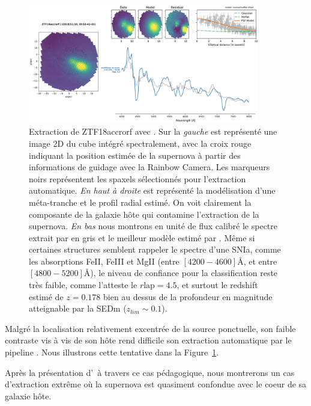 \documentclass[../main/main.tex]{subfiles}
\begin{document}
\begin{figure}[ht]
  \centering
  \includegraphics[width=0.9\textwidth]{../figures/04_hypergal/easycaseextractionpysedm.png}
  \caption[Extraction de ZTF18accrorf avec \pysedm]{Extraction de
    ZTF18accrorf avec \pysedm. Sur la \textit{gauche} est représenté une image 2D
  du cube intégré spectralement, avec la croix rouge indiquant la
  position estimée de la supernova à partir des informations de
    guidage avec la Rainbow Camera. Les marqueurs noirs représentent les
  spaxels sélectionnés pour l'extraction automatique. \textit{En haut à
    droite} est représenté la modélisation d'une méta-tranche et le
  profil radial estimé. On voit clairement la composante de la galaxie
  hôte qui contamine l'extraction de la supernova. \textit{En bas} nous
  montrons en unité de flux calibré le spectre extrait par \pysedm en gris et le
meilleur modèle estimé par . Même si certaines structures
semblent rappeler le spectre d'une SNIa, comme les absorptions FeII,
FeIII et MgII (entre $[4200-4600]$\AA, et entre $[4800-5200]$\AA), le
niveau de confiance pour la classification reste très faible, comme
l'atteste le $r\text{lap}=4.5$, et surtout le redshift estimé de
$z=0.178$ bien au dessus de la profondeur en magnitude atteignable par
la SEDm ($z_{lim}\sim0.1$).  }
  \label{fig:easycaseextractionpysedm}
\end{figure}


Malgré la localisation relativement excentrée de la source ponctuelle,
son faible contraste vis à vis de son hôte rend difficile son extraction
automatique par le pipeline \pysedm. Nous illustrons cette tentative
dans la Figure~\ref{fig:easycaseextractionpysedm}.

Après la présentation d'\hypergal\ à travers ce cas pédagogique, nous
montrerons un cas d'extraction extrême où la supernova est quasiment
confondue avec le coeur de sa galaxie hôte.




\end{document}
